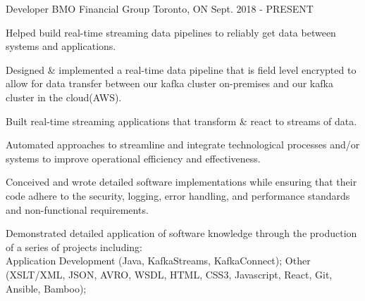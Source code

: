 


\begin{cventries}

\cventry
{Developer} %
{BMO Financial Group} %
{Toronto, ON} %
{Sept. 2018 - PRESENT} %
{ %
\begin{cvitems}
\item {Helped build real-time streaming data pipelines to reliably get data between systems and applications.}
\item {Designed \& implemented a real-time data pipeline that is field level encrypted to allow for data transfer between our kafka cluster on-premises and our kafka cluster in the cloud(AWS).}
\item {Built real-time streaming applications that transform \& react to streams of data.}
\item {Automated approaches to streamline and integrate technological processes and/or systems to improve operational efficiency and effectiveness.}
\item {Conceived and wrote detailed software implementations while ensuring that their code adhere to the security, logging, error handling, and performance standards and non-functional requirements.}
\item {Demonstrated detailed application of software knowledge through the production of a series of projects including: \\Application Development (Java, KafkaStreams, KafkaConnect); Other (XSLT/XML, JSON, AVRO, WSDL, HTML, CSS3, Javascript, React, Git, Ansible, Bamboo);}
\end{cvitems}
}


\end{cventries}

